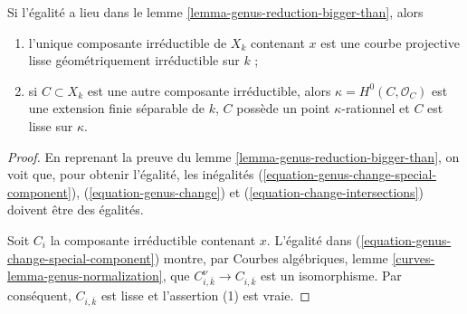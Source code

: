 \begin{lemma}
\label{lemma-equality-genus-reduction-bigger-than}
Si l'égalité a lieu dans le lemme
\ref{lemma-genus-reduction-bigger-than}, alors
\begin{enumerate}
\item l'unique composante irréductible de $X_k$ contenant $x$ est une
courbe projective lisse géométriquement irréductible sur $k$ ;
\item si $C \subset X_k$ est une autre composante irréductible, alors
$\kappa = H^0(C, \mathcal{O}_C)$ est une extension finie séparable de $k$,
$C$ possède un point $\kappa$-rationnel et $C$ est lisse sur $\kappa$.
\end{enumerate}
\end{lemma}

\begin{proof}
En reprenant la preuve du lemme
\ref{lemma-genus-reduction-bigger-than}, on voit que, pour obtenir
l'égalité, les inégalités
(\ref{equation-genus-change-special-component}),
(\ref{equation-genus-change}) et
(\ref{equation-change-intersections})
doivent être des égalités.

\medskip\noindent
Soit $C_i$ la composante irréductible contenant $x$.
L'égalité dans (\ref{equation-genus-change-special-component}) montre, par
Courbes algébriques, lemme \ref{curves-lemma-genus-normalization}, que
$C_{i, \overline{k}}^\nu \to C_{i, \overline{k}}$ est un isomorphisme.
Par conséquent, $C_{i, \overline{k}}$ est lisse et l'assertion (1) est vraie.


\end{proof}
